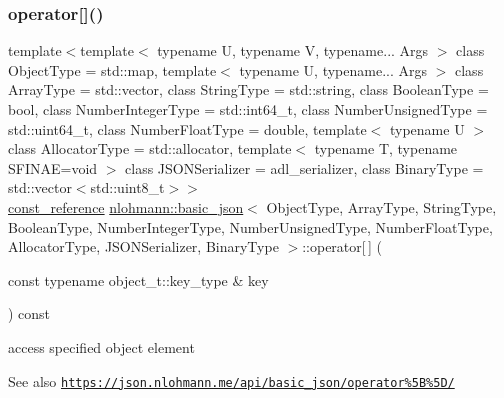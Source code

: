 \subsubsection{\texorpdfstring{operator[]()}{operator[]()}\hspace{0.1cm}{\footnotesize\ttfamily [4/8]}}
{\footnotesize\ttfamily template$<$template$<$ typename U, typename V, typename... Args $>$ class Object\+Type = std\+::map, template$<$ typename U, typename... Args $>$ class Array\+Type = std\+::vector, class String\+Type  = std\+::string, class Boolean\+Type  = bool, class Number\+Integer\+Type  = std\+::int64\+\_\+t, class Number\+Unsigned\+Type  = std\+::uint64\+\_\+t, class Number\+Float\+Type  = double, template$<$ typename U $>$ class Allocator\+Type = std\+::allocator, template$<$ typename T, typename S\+F\+I\+N\+A\+E=void $>$ class J\+S\+O\+N\+Serializer = adl\+\_\+serializer, class Binary\+Type  = std\+::vector$<$std\+::uint8\+\_\+t$>$$>$ \\
\hyperlink{classnlohmann_1_1basic__json_ab8a1c33ee7b154fc41ca2545aa9724e6}{const\+\_\+reference} \hyperlink{classnlohmann_1_1basic__json}{nlohmann\+::basic\+\_\+json}$<$ Object\+Type, Array\+Type, String\+Type, Boolean\+Type, Number\+Integer\+Type, Number\+Unsigned\+Type, Number\+Float\+Type, Allocator\+Type, J\+S\+O\+N\+Serializer, Binary\+Type $>$\+::operator\mbox{[}$\,$\mbox{]} (\begin{DoxyParamCaption}\item[{const typename object\+\_\+t\+::key\+\_\+type \&}]{key }\end{DoxyParamCaption}) const\hspace{0.3cm}{\ttfamily [inline]}}



access specified object element 

\begin{DoxySeeAlso}{See also}
\href{https://json.nlohmann.me/api/basic_json/operator%5B%5D/}{\tt https\+://json.\+nlohmann.\+me/api/basic\+\_\+json/operator\%5\+B\%5\+D/} 
\end{DoxySeeAlso}
\mbox{\label{classnlohmann_1_1basic__json_abc94831476f7b4d3efe6f2e9036c7188}} 

